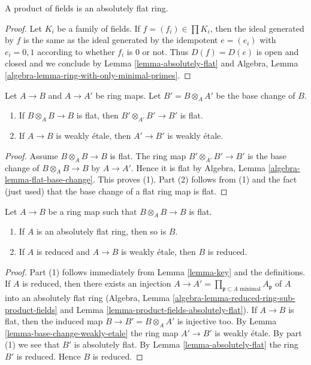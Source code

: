 \begin{lemma}
\label{lemma-product-fields-absolutely-flat}
A product of fields is an absolutely flat ring.
\end{lemma}

\begin{proof}
Let $K_i$ be a family of fields. If $f = (f_i) \in \prod K_i$, then
the ideal generated by $f$ is the same as the ideal generated by
the idempotent $e = (e_i)$ with $e_i = 0, 1$ according to whether
$f_i$ is $0$ or not. Thus $D(f) = D(e)$ is open and closed and we conclude
by Lemma \ref{lemma-absolutely-flat} and
Algebra, Lemma \ref{algebra-lemma-ring-with-only-minimal-primes}.
\end{proof}

\begin{lemma}
\label{lemma-base-change-weakly-etale}
Let $A \to B$ and $A \to A'$ be ring maps. Let $B' = B \otimes_A A'$
be the base change of $B$.
\begin{enumerate}
\item If $B \otimes_A B \to B$ is flat, then $B' \otimes_{A'} B' \to B'$
is flat.
\item If $A \to B$ is weakly \'etale, then $A' \to B'$ is weakly \'etale.
\end{enumerate}
\end{lemma}

\begin{proof}
Assume $B \otimes_A B \to B$ is flat.
The ring map $B' \otimes_{A'} B' \to B'$ is the base change of
$B \otimes_A B \to B$ by $A \to A'$. Hence it is flat by
Algebra, Lemma \ref{algebra-lemma-flat-base-change}. This proves (1).
Part (2) follows from (1) and the fact (just used) that the
base change of a flat ring map is flat.
\end{proof}

\begin{lemma}
\label{lemma-absolutely-flat-over-absolutely-flat}
Let $A \to B$ be a ring map such that $B \otimes_A B \to B$ is flat.
\begin{enumerate}
\item If $A$ is an absolutely flat ring, then so is $B$.
\item If $A$ is reduced and $A \to B$ is weakly \'etale, then $B$ is reduced.
\end{enumerate}
\end{lemma}

\begin{proof}
Part (1) follows immediately from Lemma \ref{lemma-key} and the definitions.
If $A$ is reduced, then there exists an injection
$A \to A' = \prod_{\mathfrak p \subset A\text{ minimal}} A_\mathfrak p$
of $A$ into an absolutely flat ring
(Algebra, Lemma \ref{algebra-lemma-reduced-ring-sub-product-fields} and
Lemma \ref{lemma-product-fields-absolutely-flat}).
If $A \to B$ is flat, then the induced map $B \to B' = B \otimes_A A'$
is injective too. By Lemma \ref{lemma-base-change-weakly-etale}
the ring map $A' \to B'$ is weakly \'etale.
By part (1) we see that $B'$ is absolutely flat.
By Lemma \ref{lemma-absolutely-flat} the ring $B'$ is reduced.
Hence $B$ is reduced.
\end{proof}

